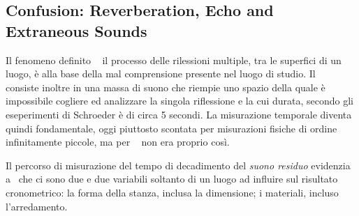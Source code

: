 \subsection{Confusion: Reverberation, Echo and Extraneous Sounds}

Il fenomeno definito \rev~ il processo delle rilessioni multiple,
tra le superfici di un luogo, è alla base della mal comprensione presente nel luogo di studio. 
Il \rev~ consiste inoltre in una massa
di suono che riempie uno spazio della quale è impossibile cogliere ed analizzare
la singola riflessione e la cui durata, secondo gli eseperimenti di Schroeder è di circa 5 secondi.
La misurazione temporale diventa quindi fondamentale, oggi piuttosto scontata
per misurazioni fisiche di ordine infinitamente piccole, ma per \ws~ non era proprio
così.

Il percorso di misurazione del tempo di decadimento del \emph{suono residuo} evidenzia
a \ws~che ci sono due e due variabili soltanto di un luogo  ad influire sul
risultato cronometrico: la forma della stanza, inclusa la dimensione; i materiali,
incluso l'arredamento.

\bigskip






